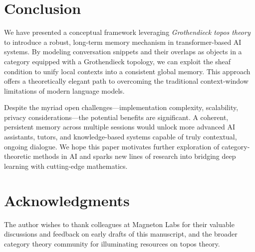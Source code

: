 \documentclass{article}
\begin{document}
\section{Conclusion}
\label{sec:conclusion}

We have presented a conceptual framework leveraging \emph{Grothendieck topos theory} to introduce a robust, long-term memory mechanism in transformer-based AI systems. By modeling conversation snippets and their overlaps as objects in a category equipped with a Grothendieck topology, we can exploit the sheaf condition to unify local contexts into a consistent global memory. This approach offers a theoretically elegant path to overcoming the traditional context-window limitations of modern language models.

Despite the myriad open challenges—implementation complexity, scalability, privacy considerations—the potential benefits are significant. A coherent, persistent memory across multiple sessions would unlock more advanced AI assistants, tutors, and knowledge-based systems capable of truly contextual, ongoing dialogue. We hope this paper motivates further exploration of category-theoretic methods in AI and sparks new lines of research into bridging deep learning with cutting-edge mathematics.

\section*{Acknowledgments}

The author wishes to thank colleagues at Magneton Labs for their valuable discussions and feedback on early drafts of this manuscript, and the broader category theory community for illuminating resources on topos theory.
\end{document}
